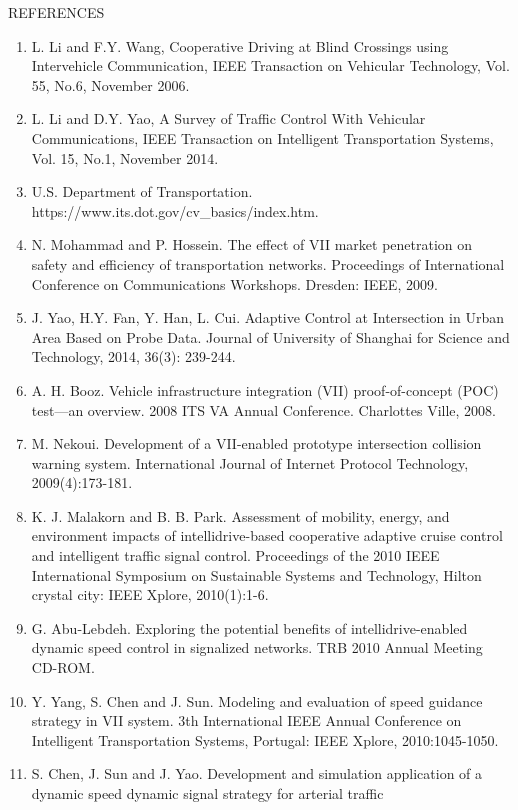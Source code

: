 REFERENCES

\begin{enumerate}
\def\labelenumi{\arabic{enumi}.}
\item
  L. Li and F.Y. Wang, Cooperative Driving at Blind Crossings using
  Intervehicle Communication, IEEE Transaction on Vehicular Technology,
  Vol. 55, No.6, November 2006.
\item
  L. Li and D.Y. Yao, A Survey of Traffic Control With Vehicular
  Communications, IEEE Transaction on Intelligent Transportation
  Systems, Vol. 15, No.1, November 2014.
\item
  U.S. Department of Transportation.
  https://www.its.dot.gov/cv\_basics/index.htm.
\item
  N. Mohammad and P. Hossein. The effect of VII market penetration on
  safety and efficiency of transportation networks. Proceedings of
  International Conference on Communications Workshops. Dresden: IEEE,
  2009.
\item
  J. Yao, H.Y. Fan, Y. Han, L. Cui. Adaptive Control at Intersection in
  Urban Area Based on Probe Data. Journal of University of Shanghai for
  Science and Technology, 2014, 36(3): 239-244.
\item
  A. H. Booz. Vehicle infrastructure integration (VII) proof-of-concept
  (POC) test---an overview. 2008 ITS VA Annual Conference. Charlottes
  Ville, 2008.
\item
  M. Nekoui. Development of a VII-enabled prototype intersection
  collision warning system. International Journal of Internet Protocol
  Technology, 2009(4):173-181.
\item
  K. J. Malakorn and B. B. Park. Assessment of mobility, energy, and
  environment impacts of intellidrive-based cooperative adaptive cruise
  control and intelligent traffic signal control. Proceedings of the
  2010 IEEE International Symposium on Sustainable Systems and
  Technology, Hilton crystal city: IEEE Xplore, 2010(1):1-6.
\item
  G. Abu-Lebdeh. Exploring the potential benefits of
  intellidrive-enabled dynamic speed control in signalized networks. TRB
  2010 Annual Meeting CD-ROM.
\item
  Y. Yang, S. Chen and J. Sun. Modeling and evaluation of speed guidance
  strategy in VII system. 3th International IEEE Annual Conference on
  Intelligent Transportation Systems, Portugal: IEEE Xplore,
  2010:1045-1050.
\item
  S. Chen, J. Sun and J. Yao. Development and simulation application of
  a dynamic speed dynamic signal strategy for arterial traffic

\end{enumerate}
